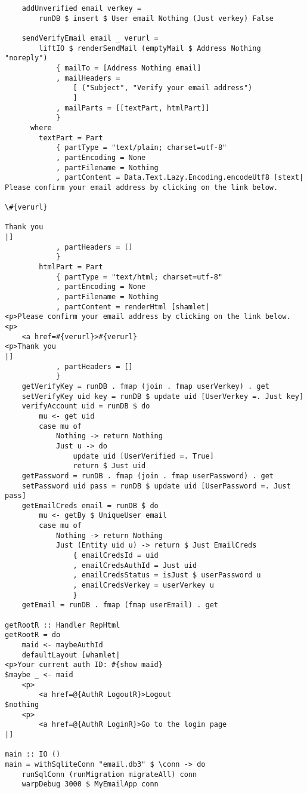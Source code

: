 \begin{lstlisting}
    addUnverified email verkey =
        runDB $ insert $ User email Nothing (Just verkey) False

    sendVerifyEmail email _ verurl =
        liftIO $ renderSendMail (emptyMail $ Address Nothing "noreply")
            { mailTo = [Address Nothing email]
            , mailHeaders =
                [ ("Subject", "Verify your email address")
                ]
            , mailParts = [[textPart, htmlPart]]
            }
      where
        textPart = Part
            { partType = "text/plain; charset=utf-8"
            , partEncoding = None
            , partFilename = Nothing
            , partContent = Data.Text.Lazy.Encoding.encodeUtf8 [stext|
Please confirm your email address by clicking on the link below.

\#{verurl}

Thank you
|]
            , partHeaders = []
            }
        htmlPart = Part
            { partType = "text/html; charset=utf-8"
            , partEncoding = None
            , partFilename = Nothing
            , partContent = renderHtml [shamlet|
<p>Please confirm your email address by clicking on the link below.
<p>
    <a href=#{verurl}>#{verurl}
<p>Thank you
|]
            , partHeaders = []
            }
    getVerifyKey = runDB . fmap (join . fmap userVerkey) . get
    setVerifyKey uid key = runDB $ update uid [UserVerkey =. Just key]
    verifyAccount uid = runDB $ do
        mu <- get uid
        case mu of
            Nothing -> return Nothing
            Just u -> do
                update uid [UserVerified =. True]
                return $ Just uid
    getPassword = runDB . fmap (join . fmap userPassword) . get
    setPassword uid pass = runDB $ update uid [UserPassword =. Just pass]
    getEmailCreds email = runDB $ do
        mu <- getBy $ UniqueUser email
        case mu of
            Nothing -> return Nothing
            Just (Entity uid u) -> return $ Just EmailCreds
                { emailCredsId = uid
                , emailCredsAuthId = Just uid
                , emailCredsStatus = isJust $ userPassword u
                , emailCredsVerkey = userVerkey u
                }
    getEmail = runDB . fmap (fmap userEmail) . get

getRootR :: Handler RepHtml
getRootR = do
    maid <- maybeAuthId
    defaultLayout [whamlet|
<p>Your current auth ID: #{show maid}
$maybe _ <- maid
    <p>
        <a href=@{AuthR LogoutR}>Logout
$nothing
    <p>
        <a href=@{AuthR LoginR}>Go to the login page
|]

main :: IO ()
main = withSqliteConn "email.db3" $ \conn -> do
    runSqlConn (runMigration migrateAll) conn
    warpDebug 3000 $ MyEmailApp conn
\end{lstlisting}

